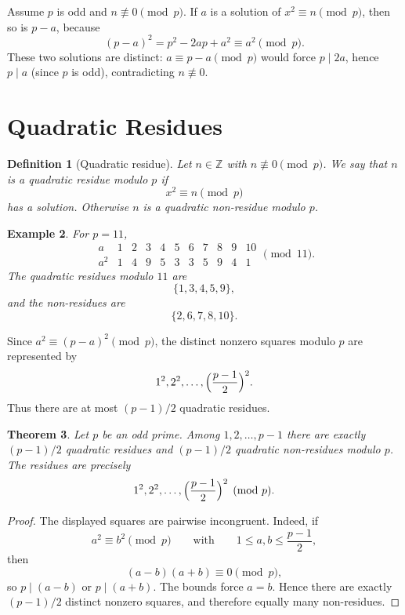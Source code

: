\documentclass[11pt]{article}
\newtheorem{theorem}{Theorem}[section]
\newtheorem{definition}[theorem]{Definition}
\newtheorem{example}[theorem]{Example}
\theoremstyle{remark}
\newcommand{\Z}{\mathbb Z}
\begin{document}
Assume $p$ is odd and $n\not\equiv 0\pmod p$. If $a$ is a solution of
$x^2\equiv n\pmod p$, then so is $p-a$, because
\[
    (p-a)^2=p^2-2ap+a^2\equiv a^2\pmod p.
\]
These two solutions are distinct: $a\equiv p-a\pmod p$ would force
$p\mid 2a$, hence $p\mid a$ (since $p$ is odd), contradicting $n\not\equiv 0$.

\section{Quadratic Residues}

\begin{definition}[Quadratic residue]
Let $n\in\Z$ with $n\not\equiv 0\pmod p$. We say that $n$ is a
\emph{quadratic residue} modulo $p$ if
\[
    x^2\equiv n\pmod p
\]
has a solution. Otherwise $n$ is a \emph{quadratic non-residue} modulo $p$.
\end{definition}

\begin{example}
For $p=11$,
\[
\begin{array}{c|cccccccccc}
a&1&2&3&4&5&6&7&8&9&10\\
\hline
a^2&1&4&9&5&3&3&5&9&4&1
\end{array}
\pmod{11}.
\]
The quadratic residues modulo $11$ are
\[
    \{1,3,4,5,9\},
\]
and the non-residues are
\[
    \{2,6,7,8,10\}.
\]
\end{example}

Since $a^2\equiv(p-a)^2\pmod p$, the distinct nonzero squares modulo $p$
are represented by
\[
    1^2,2^2,\ldots,\Bigl(\frac{p-1}{2}\Bigr)^2.
\]
Thus there are at most $(p-1)/2$ quadratic residues.

\begin{theorem}
Let $p$ be an odd prime. Among $1,2,\ldots,p-1$ there are exactly
$(p-1)/2$ quadratic residues and $(p-1)/2$ quadratic non-residues modulo
$p$. The residues are precisely
\[
    1^2,2^2,\ldots,\Bigl(\frac{p-1}{2}\Bigr)^2\pmod p.
\]
\end{theorem}

\begin{proof}
The displayed squares are pairwise incongruent. Indeed, if
\[
    a^2\equiv b^2\pmod p
    \qquad\text{with}\qquad
    1\le a,b\le\frac{p-1}{2},
\]
then
\[
    (a-b)(a+b)\equiv 0\pmod p,
\]
so $p\mid(a-b)$ or $p\mid(a+b)$. The bounds force $a=b$. Hence there are
exactly $(p-1)/2$ distinct nonzero squares, and therefore equally many
non-residues.
\end{proof}
\end{document}

